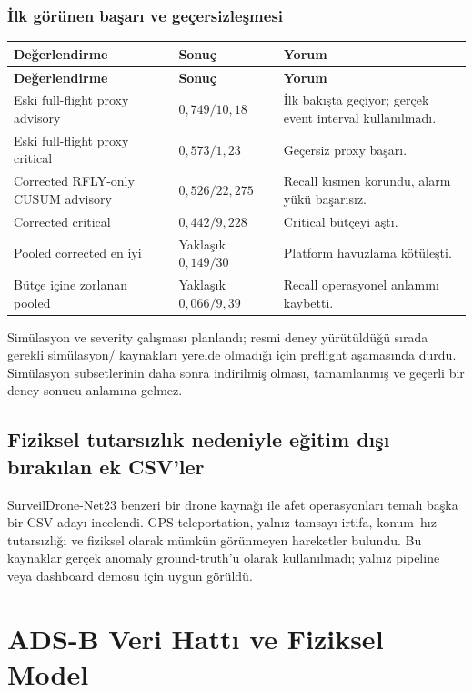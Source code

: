 \documentclass[11pt,a4paper,oneside]{report}
\newcommand{\code}[1]{\texttt{\detokenize{#1}}}
\begin{document}
\subsection{İlk görünen başarı ve geçersizleşmesi}

\begin{longtable}{L{0.40\textwidth}L{0.23\textwidth}L{0.28\textwidth}}
\toprule
\textbf{Değerlendirme} & \textbf{Sonuç} & \textbf{Yorum}\\
\midrule
\endfirsthead
\toprule
\textbf{Değerlendirme} & \textbf{Sonuç} & \textbf{Yorum}\\
\midrule
\endhead
Eski full-flight proxy advisory & \(0{,}749/10{,}18\) & İlk bakışta geçiyor; gerçek event interval kullanılmadı.\\
Eski full-flight proxy critical & \(0{,}573/1{,}23\) & Geçersiz proxy başarı.\\
Corrected RFLY-only \code{itki_komutu} CUSUM advisory & \(0{,}526/22{,}275\) & Recall kısmen korundu, alarm yükü başarısız.\\
Corrected critical & \(0{,}442/9{,}228\) & Critical bütçeyi aştı.\\
Pooled corrected en iyi & Yaklaşık \(0{,}149/30\) & Platform havuzlama kötüleşti.\\
Bütçe içine zorlanan pooled & Yaklaşık \(0{,}066/9{,}39\) & Recall operasyonel anlamını kaybetti.\\
\bottomrule
\end{longtable}

Simülasyon ve severity çalışması planlandı; resmi deney yürütüldüğü sırada
gerekli simülasyon/\code{TestInfo} kaynakları yerelde olmadığı için preflight
aşamasında durdu. Simülasyon subsetlerinin daha sonra indirilmiş olması,
tamamlanmış ve geçerli bir deney sonucu anlamına gelmez.

\section{Fiziksel tutarsızlık nedeniyle eğitim dışı bırakılan ek CSV'ler}

SurveilDrone-Net23 benzeri bir drone kaynağı ile afet operasyonları temalı
başka bir CSV adayı incelendi. GPS teleportation, yalnız tamsayı irtifa,
konum--hız tutarsızlığı ve fiziksel olarak mümkün görünmeyen hareketler
bulundu. Bu kaynaklar gerçek anomaly ground-truth'u olarak kullanılmadı;
yalnız pipeline veya dashboard demosu için uygun görüldü.

\chapter{ADS-B Veri Hattı ve Fiziksel Model}
\end{document}
